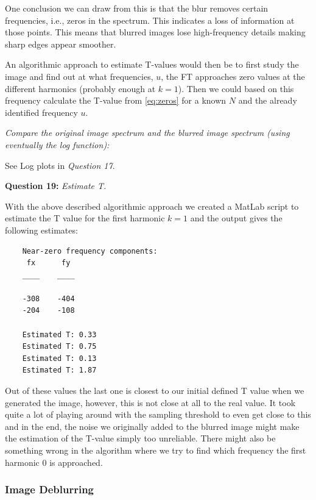 One conclusion we can draw from this is that the blur removes certain frequencies, i.e., zeros in the spectrum. This indicates a loss of information at those points. This means that blurred images lose high-frequency details making sharp edges appear smoother.

An algorithmic approach to estimate T-values would then be to first study the image and find out at what frequencies, $u$, the FT approaches zero values at the different harmonics (probably enough at $k=1$). 
Then we could based on this frequency calculate the T-value from \autoref{eq:zeros} for a known $N$ and the already identified frequency $u$. 


\textit{Compare the original image spectrum and the blurred image spectrum (using eventually the log function):}

See Log plots in \textit{Question 17}. 



\textbf{Question 19:} \textit{Estimate T.}

With the above described algorithmic approach we created a MatLab script to estimate the T value for the first harmonic $k=1$ and the output gives the following estimates:
\begin{lstlisting}
    Near-zero frequency components:
     fx      fy 
    ____    ____
    
    -308    -404
    -204    -108
    
    Estimated T: 0.33
    Estimated T: 0.75
    Estimated T: 0.13
    Estimated T: 1.87
\end{lstlisting}

Out of these values the last one is closest to our initial defined T value when we generated the image, however, this is not close at all to the real value. It took quite a lot of playing around with the sampling threshold to even get close to this and in the end, the noise we originally added to the blurred image might make the estimation of the T-value simply too unreliable. There might also be something wrong in the algorithm where we try to find which frequency the first harmonic 0 is approached.


\subsubsection{Image Deblurring}

